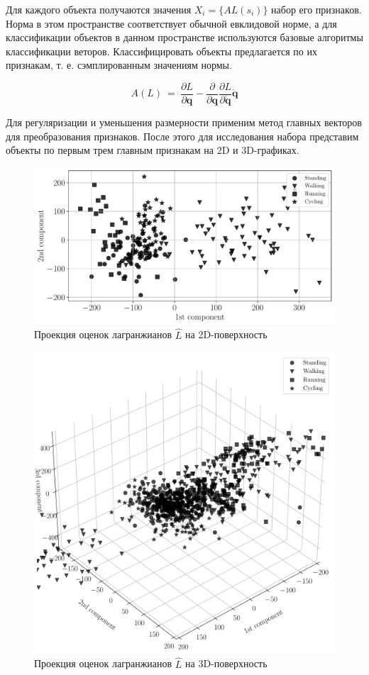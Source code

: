\documentclass[12pt, twoside]{article}
\begin{document}
Для каждого объекта получаются значения $X_i = \{AL(s_i)\}$ набор его признаков. Норма в этом пространстве соответствует обычной евклидовой норме, а для классификации объектов в данном пространстве используются базовые алгоритмы классификации веторов. Классифицировать объекты предлагается по их признакам, т. е. сэмплированным значениям нормы.

\[A(L)\ =\ \frac{\partial L}{\partial \mathbf{q}}-\frac{\partial}{\partial \mathbf{q}} \frac{\partial L}{\partial \dot{\mathbf{q}}} \dot{\mathbf{q}}\]

Для регуляризации и уменьшения размерности применим метод главных векторов для преобразования признаков. После этого для исследования набора представим объекты по первым трем главным признакам на 2D и 3D-графиках.

\begin{figure}[H]
 \centering
 \includegraphics[scale = 0.5]{Data.pdf}
 \caption{Проекция оценок лагранжианов $\hat{L}$ на 2D-поверхность}
 \label{fig: 2D}
\end{figure}

\begin{figure}[H]
 \centering
 \includegraphics[scale = 0.4]{Data_3D.pdf}
 \caption{Проекция оценок лагранжианов $\hat{L}$ на 3D-поверхность}
 \label{fig: 3D}
\end{figure}
\end{document}
